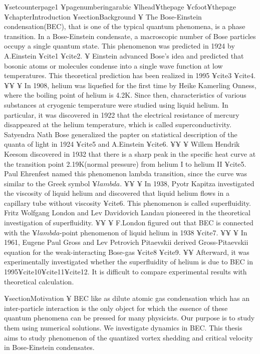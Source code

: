 ¥setcounter{page}{1}
¥pagenumbering{arabic}
¥lhead{¥thepage}
¥cfoot{¥thepage}
¥chapter{Introduction}
¥section{Background}
¥ The Bose-Einstein condensation(BEC), that is one of the typical quantum phenomena,
is a phase transition.
In a Bose-Einstein condensate, a macroscopic number of
Bose particles occupy a single quantum state.
This phenomenon was predicted in 1924 by A.Einstein ¥cite{1} ¥cite{2}.
¥ Einstein advanced Bose's idea and predicted that bosonic atoms or molecules
condense into a single wave function at low temperatures.
This theoretical prediction has been realized in 1995 ¥cite{3} ¥cite{4}.
¥¥
¥ In 1908, helium was liquefied for the first time by Heike Kamerling Onness, 
where the boiling point of helium is 4.2K. 
Since then, characteristics of various substances at cryogenic temperature
were studied using liquid helium. 
In particular, it was discovered in 1922 that the electrical resistance of mercury
disappeared at the helium temperature, which is called superconductivity.
Satyendra Nath Bose generalized the papter on statistical description of the quanta of light in 1924 ¥cite{5} and A.Einstein ¥cite{6}.
¥¥
¥ Willem Hendrik Keesom discovered in 1932 that there is a sharp peak 
in the specific heat curve at the transition point 2.19K(normal pressure) 
from helium I to helium II ¥cite{5}. Paul Ehrenfest named this phenomenon lambda transition,
since the curve was similar to the Greek symbol $¥lambda$.
¥¥
¥ In 1938, Pyotr Kapitza investigated the viscosity of liquid helium and 
discovered that liquid helium flows in a capillary tube without viscosity ¥cite{6}.
This phenomenon is called superfluidity. Fritz Wolfgang London and Lev Davidovich Landau pioneered 
in the theoretical investigation of superfluidity.
¥¥
¥ F.London figured out that BEC is connected with 
the $¥lambda$-point phenomenon of liquid helium in 1938 ¥cite{7}.
¥¥
¥ In 1961, Eugene Paul Gross and Lev Petrovich Pitaevskii derived Gross-Pitaevskii equation for the weak-interacting Bose-gas
¥cite{8} ¥cite{9}.
¥¥ Afterward, it was experimentally investigated whether the superfluidity of helium is due to BEC in 1995¥cite{10}¥cite{11}¥cite{12}.
It is difficult to compare experimental results with theoretical calculation. 

¥section{Motivation}
¥ BEC like as dilute atomic gas condensation which has an inter-particle interaction
is the only object for which the essence of 
these quantum phenomena can be pressed for many physicists.
Our purpose is to study them using numerical solutions.
We investigate dynamics in BEC.
This thesis aims to study phenomenon of the quantized vortex shedding
and critical velocity in Bose-Einstein condensates.

